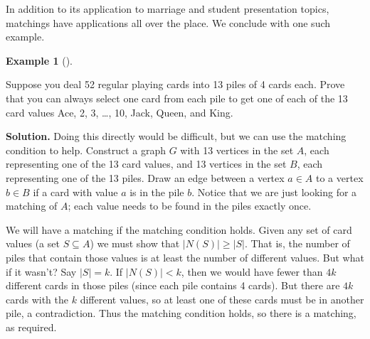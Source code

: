 \documentclass[10pt,]{book}
\theoremstyle{plain}
\theoremstyle{definition}
\newtheorem{example}[theorem]{Example}
\theoremstyle{definition}
\theoremstyle{definition}
\numberwithin{equation}{chapter}
\newcommand{\lt}{ < }
\begin{document}
In addition to its application to marriage and student presentation topics, matchings have applications all over the place. We conclude with one such example.
%
\begin{example}[]\label{example-108}

Suppose you deal 52 regular playing cards into 13 piles of 4 cards each. Prove that you can always select one card from each pile to get one of each of the 13 card values Ace, 2, 3, \dots{}, 10, Jack, Queen, and King.
%
\par\medskip\noindent%
\textbf{Solution.}\quad
Doing this directly would be difficult, but we can use the matching condition to help. Construct a graph \(G\) with 13 vertices in the set \(A\), each representing one of the 13 card values, and 13 vertices in the set \(B\), each representing one of the 13 piles. Draw an edge between a vertex \(a \in A\) to a vertex \(b \in B\) if a card with value \(a\) is in the pile \(b\). Notice that we are just looking for a matching of \(A\); each value needs to be found in the piles exactly once.
%
\par

We will have a matching if the matching condition holds. Given any set of card values (a set \(S \subseteq A\)) we must show that \(|N(S)| \ge |S|\). That is, the number of piles that contain those values is at least the number of different values. But what if it wasn't? Say \(|S| = k\). If \(|N(S)| \lt  k\), then we would have fewer than \(4k\) different cards in those piles (since each pile contains 4 cards). But there are \(4k\) cards with the \(k\) different values, so at least one of these cards must be in another pile, a contradiction. Thus the matching condition holds, so there is a matching, as required.
%
\end{example}
\end{document}

